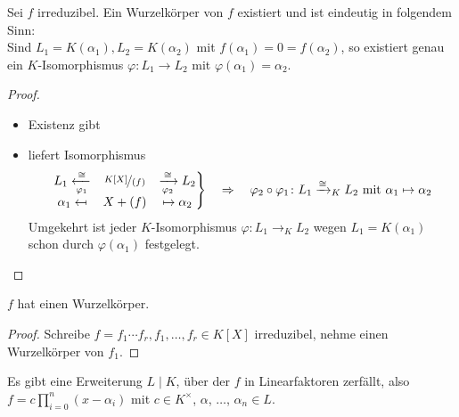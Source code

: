 \begin{proposition}
	Sei $f$ irreduzibel. Ein Wurzelkörper von $f$ existiert und ist eindeutig in folgendem Sinn:\\
	Sind $L_1 = K(\alpha_1), L_2 = K(\alpha_2)$ mit $f(\alpha_1) = 0 = f(\alpha_2)$, so existiert genau ein $K$-Isomorphismus $\varphi\colon L_1 \to L_2$ mit $\varphi(\alpha_1) = \alpha_2$.
\end{proposition}
\begin{proof}\leavevmode\vspace*{\dimexpr-\baselineskip+2\lineskip}
	\begin{itemize}
		\item Existenz gibt 
		\item {} liefert Isomorphismus
		\begin{align*}
			\left.\begin{matrix} %
				L_1 \xleftarrow[\varphi_1]{\cong} & \lnkset{K[X]}{(f)} & \xrightarrow[\varphi_2]{\cong} L_2\\
				\alpha_1 \mapsfrom & X + (f) & \mapsto \alpha_2\\
			\end{matrix}\right\rbrace
			\quad\Rightarrow \quad\varphi_2 \circ \varphi_1\colon L_1 \xrightarrow{\cong}_K L_2 \mit \alpha_1 \mapsto \alpha_2
		\end{align*}
		Umgekehrt ist jeder $K$-Isomorphismus $\varphi\colon L_1 \to_K L_2$ wegen $L_1 = K(\alpha_1)$ schon durch $\varphi(\alpha_1)$ festgelegt.
	\end{itemize}
\end{proof}
\begin{conclusion}
	$f$ hat einen Wurzelkörper.
\end{conclusion}
\begin{proof}
	Schreibe $f=f_1\cdots f_r, f_1,\dots,f_r \in K[X]$ irreduzibel, nehme einen Wurzelkörper von $f_1$.
\end{proof}
\begin{conclusion}
	Es gibt eine Erweiterung $L\mid K$, über der $f$ in Linearfaktoren zerfällt, also $f=c\prod_{i=0}^{n}(x-\alpha_i)$ mit $c \in K^{\times}$, $\alpha$, $\dots$, $\alpha_n \in L$. 
\end{conclusion}
